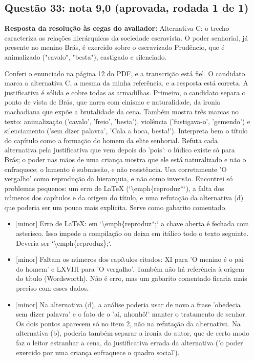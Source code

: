 \documentclass{article}%
\begin{document}
\subsection*{Questão 33: nota 9,0 (aprovada, rodada 1 de 1)}%
\textbf{Resposta da resolução às cegas do avaliador:} Alternativa C: o trecho caracteriza as relações hierárquicas da sociedade escravista. O poder senhorial, já presente no menino Brás, é exercido sobre o escravizado Prudêncio, que é animalizado ("cavalo", "besta"), castigado e silenciado.\par %
Conferi o enunciado na página 12 do PDF, e a transcrição está fiel. O candidato marca a alternativa C, a mesma da minha referência, e a resposta está correta. A justificativa é sólida e cobre todas as armadilhas. Primeiro, o candidato separa o ponto de vista de Brás, que narra com cinismo e naturalidade, da ironia machadiana que expõe a brutalidade da cena. Também mostra três marcas no texto: animalização ('cavalo', 'freio', 'besta'), violência ('fustigava{-}o', 'gemendo') e silenciamento ('sem dizer palavra', 'Cala a boca, besta!'). Interpreta bem o título do capítulo como a formação do homem da elite senhorial. Refuta cada alternativa pela justificativa que vem depois do 'pois': o lúdico existe só para Brás; o poder nas mãos de uma criança mostra que ele está naturalizado e não o enfraquece; o lamento é submissão, e não resistência. Usa corretamente 'O vergalho' como reprodução da hierarquia, e não como inversão. Encontrei só problemas pequenos: um erro de LaTeX (`\textbackslash{}emph\{reproduz*`), a falta dos números dos capítulos e da origem do título, e uma refutação da alternativa (d) que poderia ser um pouco mais explícita. Serve como gabarito comentado.%
\begin{itemize}%
\item%
{[}minor{]} Erro de LaTeX: em `\textbackslash{}emph\{reproduz*;` a chave aberta é fechada com asterisco. Isso impede a compilação ou deixa em itálico todo o texto seguinte. Deveria ser `\textbackslash{}emph\{reproduz\};`.%
\item%
{[}minor{]} Faltam os números dos capítulos citados: XI para 'O menino é o pai do homem' e LXVIII para 'O vergalho'. Também não há referência à origem do título (Wordsworth). Não é erro, mas um gabarito comentado ficaria mais preciso com esses dados.%
\item%
{[}minor{]} Na alternativa (d), a análise poderia usar de novo a frase 'obedecia sem dizer palavra' e o fato de o 'ai, nhonhô!' manter o tratamento de senhor. Os dois pontos aparecem só no item 2, não na refutação da alternativa. Na alternativa (b), poderia também separar a ironia do autor, que de certo modo faz o leitor estranhar a cena, da justificativa errada da alternativa ('o poder exercido por uma criança enfraquece o quadro social').%
\end{itemize}%
\end{document}
